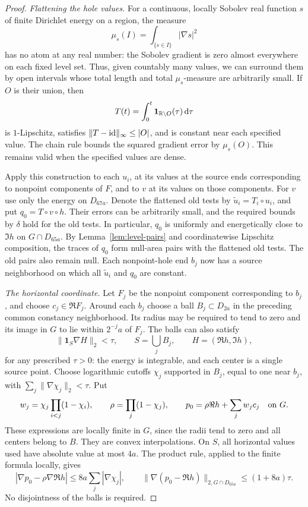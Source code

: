\begin{proof}
\emph{Flattening the hole values.}
For a continuous, locally Sobolev real function $s$ of finite Dirichlet
energy on a region, the measure
\[
 \mu_s(I)=\int_{\{s\in I\}}|\nabla s|^2
\]
has no atom at any real number: the Sobolev gradient is zero almost
everywhere on each fixed level set.  Thus, given countably many values,
we can surround them by open intervals whose total length and total
$\mu_s$-measure are arbitrarily small.  If $O$ is their union, then
\[
 T(t)=\int_0^t\mathbf1_{\mathbb R\setminus O}(\tau)\,\mathrm d\tau
\]
is $1$-Lipschitz, satisfies $\|T-\mathrm{id}\|_\infty\le |O|$, and is constant
near each specified value.  The chain rule bounds the squared gradient
error by $\mu_s(O)$.  This remains valid when the specified values are
dense.

Apply this construction to each $u_i$, at its values at the source ends
corresponding to nonpoint components of $F$, and to $v$ at its values
on those components.  For $v$ use only the energy on $D_{67a}$.
Denote the flattened old tests by $\widetilde u_i=T_i\circ u_i$, and put
$q_0=T\circ v\circ h$.  Their errors can be arbitrarily small, and
the required bounds by $\delta$ hold for the old tests.  In particular,
$q_0$ is uniformly and energetically close to $\Im h$ on $G\cap D_{65a}$.
By Lemma~\ref{lem:level-pairs} and coordinatewise Lipschitz composition,
the traces of $q_0$ form null-area pairs with the flattened old tests.
The old pairs also remain null.  Each nonpoint-hole end $b_j$ now has
a source neighborhood on which all $\widetilde u_i$ and $q_0$ are
constant.

\emph{The horizontal coordinate.}
Let $F_j$ be the nonpoint component corresponding to $b_j$, and choose
$c_j\in\Re F_j$.  Around each $b_j$ choose a ball $B_j\subset D_{2a}$
in the preceding common constancy neighborhood.  Its radius may be
required to tend to zero and its image in $G$ to lie within $2^{-j}a$
of $F_j$.  The balls can also satisfy
\begin{equation}\label{eq:small-change-support}
 \|\mathbf1_S\nabla H\|_2<\tau,
 \qquad S=\bigcup_jB_j,\qquad H=(\Re h,\Im h),
\end{equation}
for any prescribed $\tau>0$: the energy is integrable, and each center
is a single source point.  Choose logarithmic cutoffs $\chi_j$ supported
in $B_j$, equal to one near $b_j$, with
$\sum_j\|\nabla\chi_j\|_2<\tau$.  Put
\begin{equation}\label{eq:priority-interpolation}
 w_j=\chi_j\prod_{i<j}(1-\chi_i),\qquad
 \rho=\prod_j(1-\chi_j),\qquad
 p_0=\rho\Re h+\sum_jw_jc_j\quad\hbox{on }G.
\end{equation}
These expressions are locally finite in $G$, since the radii tend to
zero and all centers belong to $B$.  They are convex interpolations.
On $S$, all horizontal values used have absolute value at most $4a$.
The product rule, applied to the finite formula locally, gives
\begin{equation}\label{eq:priority-gradient}
 |\nabla p_0-\rho\nabla\Re h|
 \le 8a\sum_j|\nabla\chi_j|,\qquad
 \|\nabla(p_0-\Re h)\|_{2,G\cap D_{65a}}
 \le(1+8a)\tau.
\end{equation}
No disjointness of the balls is required.


\end{proof}
